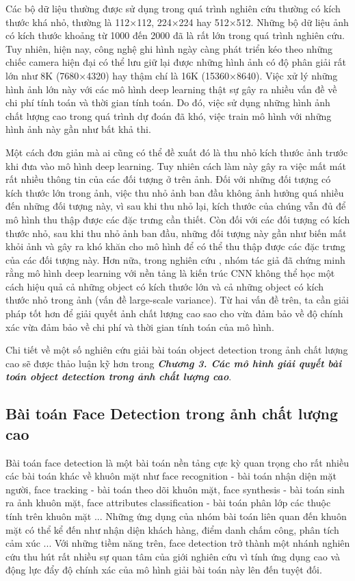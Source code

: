 {    \noindent
    Các bộ dữ liệu thường được sử dụng trong quá trình nghiên cứu thường có kích thước khá nhỏ, thường là 112×112, 224×224 hay 512×512.
    Những bộ dữ liệu ảnh có kích thước khoảng từ 1000 đến 2000 đã là rất lớn trong quá trình nghiên cứu.
    Tuy nhiên, hiện nay, công nghệ ghi hình ngày càng phát triển kéo theo những chiếc camera hiện đại có thể lưu giữ lại được những hình ảnh có độ phân giải rất lớn như 8K (7680×4320) hay thậm chí là 16K (15360×8640).
    Việc xử lý những hình ảnh lớn này với các mô hình deep learning thật sự gây ra nhiều vấn đề về chi phí tính toán và thời gian tính toán.
    Do đó, việc sử dụng những hình ảnh chất lượng cao trong quá trình dự đoán đã khó, việc train mô hình với những hình ảnh này gần như bất khả thi.

    \noindent
    Một cách đơn giản mà ai cũng có thể đề xuất đó là thu nhỏ kích thước ảnh trước khi đưa vào mô hình deep learning.
    Tuy nhiên cách làm này gây ra việc mất mát rất nhiều thông tin của các đối tượng ở trên ảnh.
    Đối với những đối tượng có kích thước lớn trong ảnh, việc thu nhỏ ảnh ban đầu không ảnh hưởng quá nhiều đến những đối tượng này, vì sau khi thu nhỏ lại, kích thước của chúng vẫn đủ để mô hình thu thập được các đặc trưng cần thiết.
    Còn đối với các đối tượng có kích thước nhỏ, sau khi thu nhỏ ảnh ban đầu, những đối tượng này gần như biến mất khỏi ảnh và gây ra khó khăn cho mô hình để có thể thu thập được các đặc trưng của các đối tượng này.
    Hơn nữa, trong nghiên cứu \cite{singh2018analysis}, nhóm tác giả đã chứng minh rằng mô hình deep learning với nền tảng là kiến trúc CNN không thể học một cách hiệu quả cả những object có kích thước lớn và cả những object có kích thước nhỏ trong ảnh (vấn đề large-scale variance).
    Từ hai vấn đề trên, ta cần giải pháp tốt hơn để giải quyết ảnh chất lượng cao sao cho vừa đảm bảo về độ chính xác vừa đảm bảo về chi phí và thời gian tính toán của mô hình.

    \noindent
    Chi tiết về một số nghiên cứu giải bài toán object detection trong ảnh chất lượng cao sẽ được thảo luận kỹ hơn trong \textbf{\textit{Chương 3. Các mô hình giải quyết bài toán object detection trong ảnh chất lượng cao}}.

    \subsection{Bài toán Face Detection trong ảnh chất lượng cao}
    Bài toán face detection là một bài toán nền tảng cực kỳ quan trọng cho rất nhiều các bài toán khác về khuôn mặt như face recognition - bài toán nhận diện mặt người, face tracking - bài toán theo dõi khuôn mặt, face synthesis - bài toán sinh ra ảnh khuôn mặt, face attributes classification - bài toán phân lớp các thuộc tính trên khuôn mặt ...
    Những ứng dụng của nhóm bài toán liên quan đến khuôn mặt có thể kể đến như nhận diện khách hàng, điểm danh chấm công, phân tích cảm xúc ...
    Với những tiềm năng trên, face detection trở thành một nhánh nghiên cứu thu hút rất nhiều sự quan tâm của giới nghiên cứu vì tính ứng dụng cao và động lực đẩy độ chính xác của mô hình giải bài toán này lên đến tuyệt đối.
    
}
